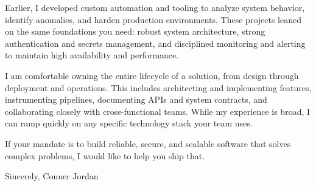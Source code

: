 \documentclass[letterpaper,11pt]{article}
\begin{document}
\vspace{16pt}

Earlier, I developed custom automation and tooling to analyze system behavior, identify anomalies, and harden production environments. These projects leaned on the same foundations you need: robust system architecture, strong authentication and secrets management, and disciplined monitoring and alerting to maintain high availability and performance.

I am comfortable owning the entire lifecycle of a solution, from design through deployment and operations. This includes architecting and implementing features, instrumenting pipelines, documenting APIs and system contracts, and collaborating closely with cross-functional teams. While my experience is broad, I can ramp quickly on any specific technology stack your team uses.

\vspace{16pt}

If your mandate is to build reliable, secure, and scalable software that solves complex problems, I would like to help you ship that.

\vspace{16pt}

Sincerely,  
Conner Jordan
\end{document}
